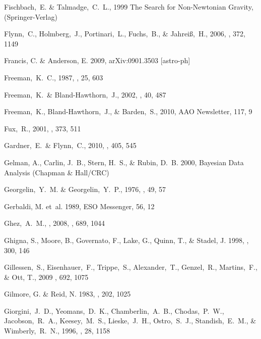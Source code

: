 \begin{thebibliography}{99}
  Fischbach,~E. \& Talmadge,~C.~L., 1999
  The Search for Non-Newtonian Gravity,
  (Springer-Verlag)

  Flynn,~C., Holmberg,~J., Portinari,~L., Fuchs,~B., \& Jahrei{\ss},~H., 2006,
  \mnras, 372, 1149

{Francis}, C. \& {Anderson}, E. 2009, arXiv:0901.3503 [astro-ph]

  Freeman,~K.~C., 1987, \araa, 25, 603

  Freeman,~K.~\& Bland-Hawthorn,~J., 2002,
  \araa, 40, 487

  Freeman,~K., Bland-Hawthorn,~J., \& Barden,~S., 2010, 
  AAO Newsletter, 117, 9

  Fux,~R., 2001,
  \aap, 373, 511

  Gardner,~E.~\& Flynn,~C., 2010,
  \mnras, 405, 545

{Gelman}, A., {Carlin}, J.~B., {Stern}, H.~S., \& {Rubin}, D.~B. 2000,
  {Bayesian Data Analysis} ({Chapman \& Hall/CRC})

  Georgelin,~Y.~M. \& Georgelin,~Y.~P., 1976, \aap, 49, 57

{Gerbaldi}, M. {et~al.} 1989, ESO Messenger, 56, 12

  Ghez,~A.~M., \etal, 2008,
  \apj, 689, 1044

{Ghigna}, S., {Moore}, B., {Governato}, F., {Lake}, G., {Quinn}, T., \&
  {Stadel}, J. 1998, \mnras, 300, 146

  Gillessen,~S., Eisenhauer,~F., Trippe,~S., Alexander,~T., Genzel,~R., Martins,~F., \& Ott, T., 2009
  \apj, 692, 1075

{Gilmore}, G. \& {Reid}, N. 1983, \mnras, 202, 1025

  Giorgini,~J.~D., Yeomans,~D.~K., Chamberlin,~A.~B., Chodas,~P.~W., Jacobson,~R.~A., Keesey,~M.~S., Lieske,~J.~H., Ostro,~S.~J., Standish,~E.~M., \& Wimberly,~R.~N., 1996, 
  \baas, 28, 1158


\end{thebibliography}
